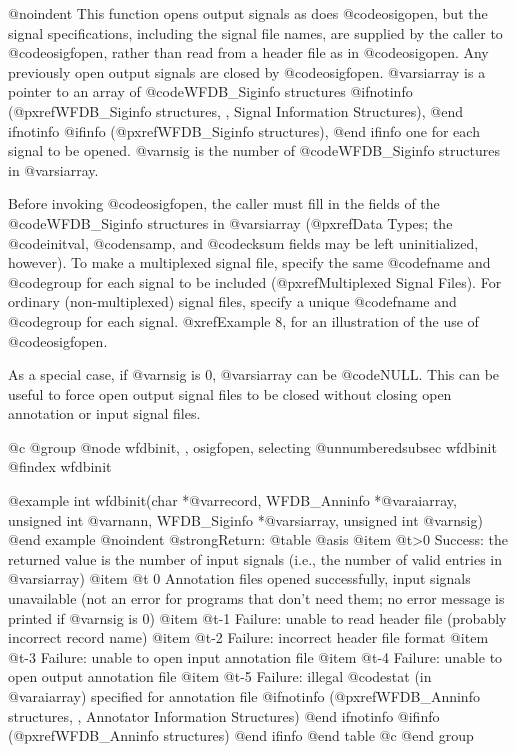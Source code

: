 {{{{{{{{@noindent
This function opens output signals as does @code{osigopen}, but the
signal specifications, including the signal file names, are supplied by
the caller to @code{osigfopen}, rather than read from a header
file as in @code{osigopen}.  Any previously open output signals are
closed by @code{osigfopen}.  @var{siarray} is a pointer to an array of
@code{WFDB_Siginfo} structures
@ifnotinfo
(@pxref{WFDB_Siginfo structures, , Signal Information Structures}),
@end ifnotinfo
@ifinfo
(@pxref{WFDB_Siginfo structures}),
@end ifinfo
one for each signal to be opened.  @var{nsig} is the number of
@code{WFDB_Siginfo} structures in @var{siarray}.

Before invoking @code{osigfopen}, the caller must fill in the fields of
the @code{WFDB_Siginfo} structures in @var{siarray} (@pxref{Data Types};
the @code{initval}, @code{nsamp}, and @code{cksum} fields may be left
uninitialized, however).  To make a multiplexed signal file, specify the
same @code{fname} and @code{group} for each signal to be included
(@pxref{Multiplexed Signal Files}).  For ordinary (non-multiplexed)
signal files, specify a unique @code{fname} and @code{group} for each
signal.  @xref{Example 8}, for an illustration of the use of
@code{osigfopen}.

As a special case, if @var{nsig} is 0, @var{siarray} can be @code{NULL}.
This can be useful to force open output signal files to be closed
without closing open annotation or input signal files.

@c @group
@node     wfdbinit, , osigfopen, selecting    
@unnumberedsubsec wfdbinit
@findex wfdbinit

@example
int wfdbinit(char *@var{record}, WFDB_Anninfo *@var{aiarray}, unsigned int @var{nann},
           WFDB_Siginfo *@var{siarray}, unsigned int @var{nsig})
@end example
@noindent
@strong{Return:}
@table @asis
@item @t{>0}
Success: the returned value is the number of input signals (i.e., the
number of valid entries in @var{siarray})
@item @t{ 0}
Annotation files opened successfully, input signals unavailable
(not an error for programs that don't need them; no error
message is printed if @var{nsig} is 0)
@item @t{-1}
Failure: unable to read header file (probably incorrect record
name)
@item @t{-2}
Failure: incorrect header file format
@item @t{-3}
Failure: unable to open input annotation file
@item @t{-4}
Failure: unable to open output annotation file
@item @t{-5}
Failure: illegal @code{stat} (in @var{aiarray}) specified for annotation file
@ifnotinfo
(@pxref{WFDB_Anninfo structures, , Annotator Information Structures})
@end ifnotinfo
@ifinfo
(@pxref{WFDB_Anninfo structures})
@end ifinfo
@end table
@c @end group

}}}}}}}}
